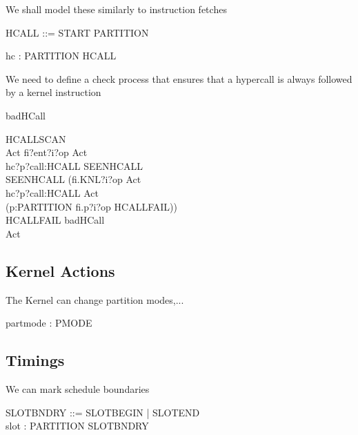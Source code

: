 We shall model these similarly to instruction fetches

\begin{circus}
HCALL ::= START \ldata PARTITION \rdata %
\end{circus}
\begin{circus}
\circchannel hc : PARTITION \cross HCALL  %
\end{circus}

We need to define a check process that ensures that a hypercall is always
followed by a kernel instruction
\begin{circus}
	\circchannel badHCall
\end{circus}
\begin{circus}
\circprocess HCALLSCAN \circdef \circbegin\\
  Act \circdef fi?ent?i?op     \then  Act\\
              \extchoice  hc?p?call:HCALL \then  SEENHCALL\\
  SEENHCALL \circdef (fi.KNL?i?op     \then  Act\\
	             \extchoice  hc?p?call:HCALL \then  Act\\
	             \extchoice  (\Extchoice  p:PARTITION \circspot fi.p?i?op \then  HCALLFAIL))\\
  HCALLFAIL \circdef badHCall \then  \Stop\\
\circspot Act\\
\circend

\end{circus}

\subsection{Kernel Actions}
  The Kernel can change partition modes,...

\begin{circus}
	\circchannel partmode : PMODE
\end{circus}
\subsection{Timings}
  We can mark schedule boundaries

\begin{circus}
	SLOTBNDRY ::= SLOTBEGIN | SLOTEND\\
	\circchannel slot : PARTITION \cross SLOTBNDRY
\end{circus}

